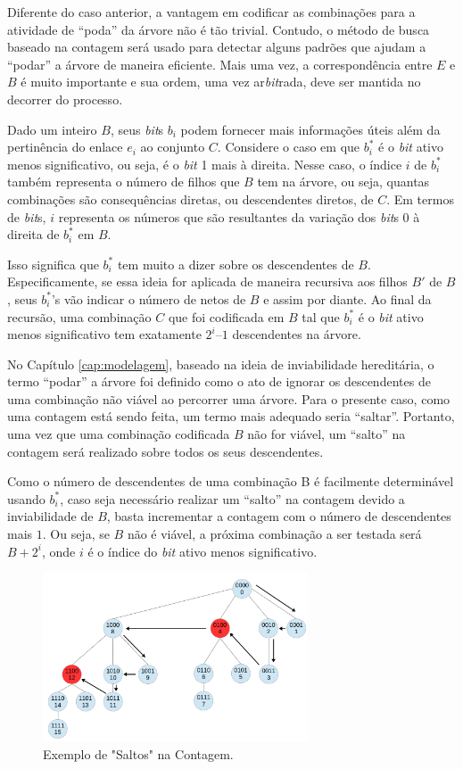 Diferente do caso anterior, a vantagem em codificar as combinações para a atividade de ``poda'' da árvore não é tão trivial. Contudo, o método de busca baseado na contagem será usado para detectar alguns padrões que ajudam a “podar” a árvore de maneira eficiente. Mais uma vez, a correspondência entre $E$ e $B$ é muito importante e sua ordem, uma vez ar{\it bit}rada, deve ser mantida no decorrer do processo. 

Dado um inteiro $B$, seus {\it bit}s $b_i$ podem fornecer mais informações úteis além da pertinência do enlace $e_i$ ao conjunto $C$. Considere o caso em que $b_i^*$ é o {\it bit} ativo menos significativo, ou seja, é o {\it bit} 1 mais à direita. Nesse caso, o índice $i$ de $b_i^*$ também representa o número de filhos que $B$ tem na árvore, ou seja, quantas combinações são consequências diretas, ou descendentes diretos, de $C$. Em termos de {\it bit}s, $i$ representa os números que são resultantes da variação dos {\it bit}s 0 à direita de $b_i^*$ em $B$.

Isso significa que $b_i^*$ tem muito a dizer sobre os descendentes de $B$. Especificamente, se essa ideia for aplicada de maneira recursiva aos filhos $B'$ de $B$, seus $b_i^*$’s vão indicar o número de netos de $B$ e assim por diante. Ao final da recursão, uma combinação $C$ que foi codificada em $B$ tal que $b_i^*$ é o {\it bit} ativo menos significativo tem exatamente $2^i–1$ descendentes na árvore.

No Capítulo \ref{cap:modelagem}, baseado na ideia de inviabilidade hereditária, o termo “podar” a árvore foi definido como o ato de ignorar os descendentes de uma combinação não viável ao percorrer uma árvore. Para o presente caso, como uma contagem está sendo feita, um termo mais adequado seria “saltar”. Portanto, uma vez que uma combinação codificada $B$ não for viável, um “salto” na contagem será realizado sobre todos os seus descendentes.

Como o número de descendentes de uma combinação B é facilmente determinável usando $b_i^*$, caso seja necessário realizar um “salto” na contagem devido a inviabilidade de $B$, basta incrementar a contagem com o número de descendentes mais $1$. Ou seja, se $B$ não é viável, a próxima combinação a ser testada será $B + 2^i$, onde $i$ é o índice do {\it bit} ativo menos significativo.

\begin{figure}[htb]
\centering
\includegraphics[width=0.7\textwidth]{figs/saltos}
\caption[Exemplo de "Saltos" na Contagem.]
{Exemplo de "Saltos" na Contagem.}
\label{fig:saltos}
\end{figure}

